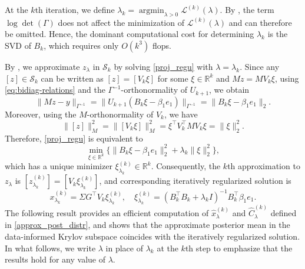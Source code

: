 \documentclass[]{myarticle}
\newcommand\argmin{\mathop{\mathrm{argmin}}}
\begin{document}
At the $k$th iteration, we define $\lambda_k = \argmin_{\lambda>0}\mathcal{L}^{(k)}(\lambda)$. By , the term $\log\det(\Gamma)$ does not affect the minimization of $\mathcal{L}^{(k)}(\lambda)$ and can therefore be omitted. Hence, the dominant computational cost for determining $\lambda_k$ is the SVD of $B_k$, which requires only $O(k^3)$ flops.

By , we approximate $z_{\lambda}$ in $\mathcal{S}_k$ by solving \cref{proj_regu} with $\lambda=\lambda_k$. Since any $[z]\in\mathcal{S}_k$ can be written as $[z]=[V_k\xi]$ for some $\xi\in\mathbb{R}^k$ and $Mz=MV_{k}\xi$, using \cref{eq:bidiag-relations} and the $\Gamma^{-1}$-orthonormality of $U_{k+1}$, we obtain
\[ \|Mz-y\|_{\Gamma^{-1}} = \|U_{k+1}(B_k\xi - \beta_1 e_1)\|_{\Gamma^{-1}}
= \|B_k\xi - \beta_1 e_1\|_2 . \] 
Moreover, using the $M$-orthonormality of $V_k$, we have
\[ \|[z]\|_{M}^2 = \|[V_{k}\xi]\|_{M}^2 = \xi^{\top}V_{k}^{\top}MV_{k}\xi = \|\xi\|_{2}^2 . \]
Therefore, \cref{proj_regu} is equivalent to
\begin{equation}\label{proj_ls}
  \min_{\xi\in\mathbb{R}^{k}}\{\|B_k\xi-\beta_1e_1\|_2^2+\lambda_k\|\xi\|_2^2\},
\end{equation}
which has a unique minimizer $\xi_{\lambda_k}^{(k)}\in\mathbb{R}^{k}$. Consequently, the $k$th approximation to $z_{\lambda}$ is $[z_{\lambda_k}^{(k)}] = [V_{k}\xi_{\lambda_k}^{(k)}]$, and corresponding iteratively regularized solution is 
\begin{equation}\label{hyb_sol}
  x_{\lambda_k}^{(k)} = \Sigma G^{\top}V_{k}\xi_{\lambda_k}^{(k)}, \quad
  \xi_{\lambda_k}^{(k)} = (B_{k}^{\top}B_{k}+\lambda_k I)^{-1}B_{k}^{\top}\beta_1e_1.
\end{equation}
The following result provides an efficient computation of $\widehat{x}_{\lambda}^{(k)}$ and $\widehat{C}_{\lambda}^{(k)}$ defined in \cref{approx_post_distr}, and shows that the approximate posterior mean in the data-informed Krylov subspace coincides with the iteratively regularized solution. In what follows, we write $\lambda$ in place of $\lambda_k$ at the $k$th step to emphasize that the results hold for any value of $\lambda$.
\end{document}
